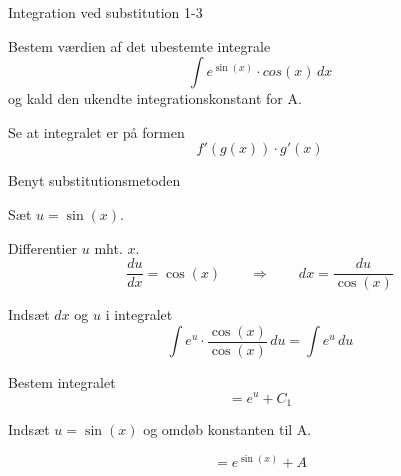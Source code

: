\documentclass{article}
\begin{document}
\begin{exercise}{Integration ved substitution 1-3}


Bestem værdien af det ubestemte integrale
\[
\int e^{\sin(x)} \cdot cos(x) \, dx
\]
og kald den ukendte integrationskonstant for A.




\hint

Se at integralet er på formen
\[
f'(g(x)) \cdot g'(x)
\]

\hint

Benyt substitutionsmetoden

\hint

Sæt $u=\sin(x)$.


\hint

Differentier $u$ mht. $x$.
\[
\frac{du}{dx} = \cos(x) \qquad\Rightarrow \qquad dx = \frac{du}{\cos(x)}
\]

\hint

Indsæt $dx$ og $u$ i integralet
\[
\int e^{u} \cdot \frac{\cos(x)}{\cos(x)} \, du = \int e^u \, du
\]

\hint

Bestem integralet
\[
= e^{u} + C_1
\]

\hint

Indsæt $u = \sin(x)$ og omdøb konstanten til A.

\hint

\[
= e^{\sin(x)} + A
\]


\end{exercise}

\newpage
\end{document}
